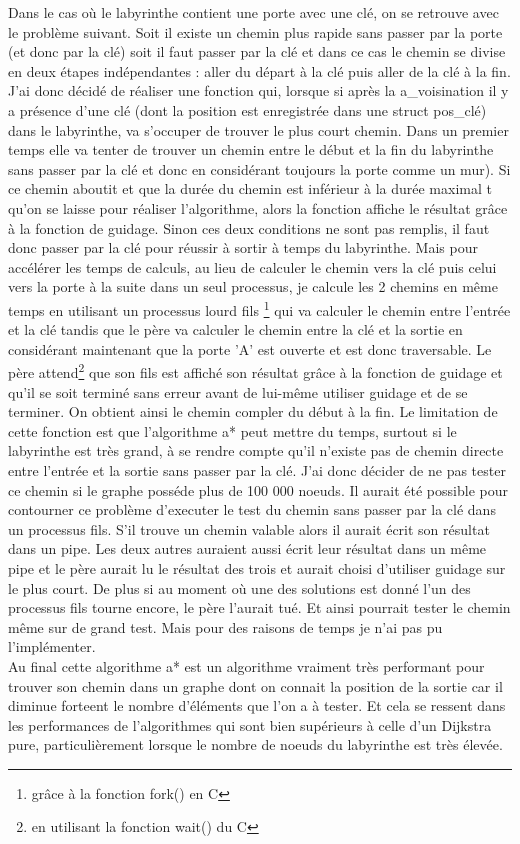 \documentclass[a4paper, 11pt]{report}
\begin{document}
Dans le cas où le labyrinthe contient une porte avec une clé, on se retrouve avec le problème suivant. Soit il existe un chemin plus rapide sans passer par la porte (et donc par la clé) soit il faut passer par la clé et dans ce cas le chemin se divise en deux étapes indépendantes : aller du départ à la clé puis aller de la clé à la fin.
J'ai donc décidé de réaliser une fonction qui, lorsque si après la a\_voisination il y a présence d'une clé (dont la position est enregistrée dans une struct pos\_clé) dans le labyrinthe, va s'occuper de trouver le plus court chemin. Dans un premier temps elle va tenter de trouver un chemin entre le début et la fin du labyrinthe sans passer par la clé et donc en considérant toujours la porte comme un mur). Si ce chemin aboutit et que la durée du chemin est inférieur à la durée maximal t qu'on se laisse pour réaliser l'algorithme, alors la fonction affiche le résultat grâce à la fonction de guidage.
Sinon ces deux conditions ne sont pas remplis, il faut donc passer par la clé pour réussir à sortir à temps du labyrinthe. Mais pour accélérer les temps de calculs, au lieu de calculer le chemin vers la clé puis celui vers la porte à la suite dans un seul processus, je calcule les 2 chemins en même temps en utilisant un processus lourd fils \footnote{grâce à la fonction fork() en C} qui va calculer le chemin entre l'entrée et la clé tandis que le père va calculer le chemin entre la clé et la sortie en considérant maintenant que la porte 'A' est ouverte et est donc traversable. Le père attend\footnote{en utilisant la fonction wait() du C} que son fils est affiché son résultat grâce à la fonction de guidage et qu'il se soit terminé sans erreur avant de lui-même utiliser guidage et de se terminer. On obtient ainsi le chemin compler du début à la fin. Le limitation de cette fonction est que l'algorithme a* peut mettre du temps, surtout si le labyrinthe est très grand, à se rendre compte qu'il n'existe pas de chemin directe entre l'entrée et la sortie sans passer par la clé. J'ai donc décider de ne pas tester ce chemin si le graphe posséde plus de 100 000 noeuds. Il aurait été possible pour contourner ce problème d'executer le test du chemin sans passer par la clé dans un processus fils. S'il trouve un chemin valable alors il aurait écrit son résultat dans un pipe. Les deux autres auraient aussi écrit leur résultat dans un même pipe et le père aurait lu le résultat des trois et aurait choisi d'utiliser guidage sur le plus court. De plus si au moment où une des solutions est donné l'un des processus fils tourne encore, le père l'aurait tué. Et ainsi pourrait tester le chemin même sur de grand test. Mais pour des raisons de temps je n'ai pas pu l'implémenter. \\
Au final cette algorithme a* est un algorithme vraiment très performant pour trouver son chemin dans un graphe dont on connait la position de la sortie car il diminue forteent le nombre d'éléments que l'on a à tester. Et cela se ressent dans les performances de l'algorithmes qui sont bien supérieurs à celle d'un Dijkstra pure, particulièrement lorsque le nombre de noeuds du labyrinthe est très élevée.
\end{document}
